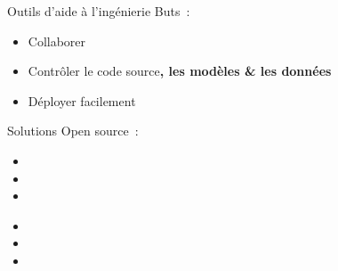 \begin{frame}{Outils d'aide à l'ingénierie}
  Buts~:
  \begin{itemize}[<+->]
    \item Collaborer
    \item Contrôler le code source\textbf{, les modèles \& les données}
    \item Déployer facilement
  \end{itemize}
\end{frame}

\begin{frame}{Solutions}
  Open source~:
  \begin{itemize}[<+->]
    \item {}
    \item {}
    \item {}
  \end{itemize}

  \begin{itemize}[<+->]
    \item {}
    \item {}
    \item {}
  \end{itemize}
\end{frame}